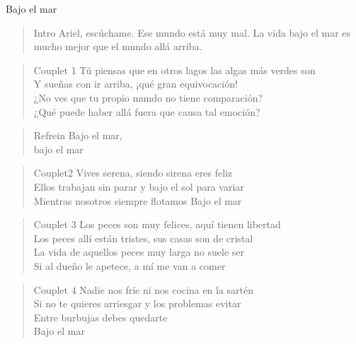 \documentclass[a4paper,11pt]{article}
\begin{document}
\begin{song}{Bajo el mar}
\begin{verse}{Intro}
Ariel, escúchame. Ese mundo está muy mal. La vida bajo el mar es mucho 
mejor que el mundo allá arriba.
\end{verse}

\begin{verse}{Couplet 1}
Tú piensas que en otros lagos las algas más verdes son\\
Y sueñas con ir arriba, ¡qué gran equivocación!\\
¿No ves que tu propio mundo no tiene comparación?\\
¿Qué puede haber allá fuera que causa tal emoción?
\end{verse}

\begin{verse}{Refrein}
Bajo el mar,\\
bajo el mar
\end{verse}

\begin{verse}{Couplet2}
Vives serena, siendo sirena eres feliz\\
Ellos trabajan sin parar y bajo el sol para variar\\
Mientras nosotros siempre flotamos Bajo el mar
\end{verse}

\begin{verse}{Couplet 3}
Los peces son muy felices, aquí tienen libertad\\
Los peces allí están tristes, sus casas son de cristal\\
La vida de aquellos peces muy larga no suele ser\\
Si al dueño le apetece, a mí me van a comer\\
\end{verse}


\begin{verse}{Couplet 4}
Nadie nos fríe ni nos cocina en la sartén \\
Si no te quieres arriesgar y los problemas evitar\\
Entre burbujas debes quedarte\\
Bajo el mar
\end{verse}


\end{song}
\end{document}
